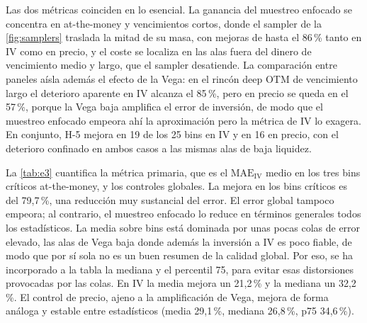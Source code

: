 \documentclass[11pt,a4paper]{article}
\begin{document}
Las dos métricas coinciden en lo esencial. La ganancia del muestreo enfocado se concentra en at-the-money y vencimientos cortos, donde el sampler de la \autoref{fig:samplers} traslada la mitad de su masa, con mejoras de hasta el 86\,\% tanto en IV como en precio, y el coste se localiza en las alas fuera del dinero de vencimiento medio y largo, que el sampler desatiende. La comparación entre paneles aísla además el efecto de la Vega: en el rincón deep OTM de vencimiento largo el deterioro aparente en IV alcanza el 85\,\%, pero en precio se queda en el 57\,\%, porque la Vega baja amplifica el error de inversión, de modo que el muestreo enfocado empeora ahí la aproximación pero la métrica de IV lo exagera. En conjunto, H-5 mejora en 19 de los 25 bins en IV y en 16 en precio, con el deterioro confinado en ambos casos a las mismas alas de baja liquidez.

La \autoref{tab:e3} cuantifica la métrica primaria, que es el $\text{MAE}_{\text{IV}}$ medio en los tres bins críticos at-the-money, y los controles globales. La mejora en los bins críticos es del 79,7\,\%, una reducción muy sustancial del error. El error global tampoco empeora; al contrario, el muestreo enfocado lo reduce en términos generales todos los estadísticos. La media sobre bins está dominada por unas pocas colas de error elevado, las alas de Vega baja donde además la inversión a IV es poco fiable, de modo que por sí sola no es un buen resumen de la calidad global. Por eso, se ha incorporado a la tabla la mediana y el percentil 75, para evitar esas distorsiones provocadas por las colas. En IV la media mejora un 21,2\,\% y la mediana un 32,2\,\%. El control de precio, ajeno a la amplificación de Vega, mejora de forma análoga y estable entre estadísticos (media 29,1\,\%, mediana 26,8\,\%, p75 34,6\,\%). 
\end{document}
